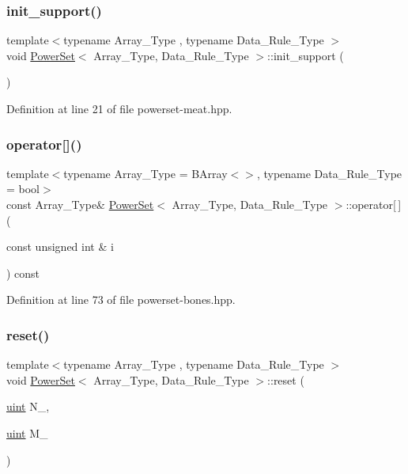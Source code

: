 \subsubsection{\texorpdfstring{init\+\_\+support()}{init\_support()}}
{\footnotesize\ttfamily template$<$typename Array\+\_\+\+Type , typename Data\+\_\+\+Rule\+\_\+\+Type $>$ \\
void \hyperlink{class_power_set}{Power\+Set}$<$ Array\+\_\+\+Type, Data\+\_\+\+Rule\+\_\+\+Type $>$\+::init\+\_\+support (\begin{DoxyParamCaption}{ }\end{DoxyParamCaption})\hspace{0.3cm}{\ttfamily [inline]}}



Definition at line 21 of file powerset-\/meat.\+hpp.

\mbox{\label{class_power_set_acc822131a9fbfd5b87f85b675f293d39}} 
\subsubsection{\texorpdfstring{operator[]()}{operator[]()}}
{\footnotesize\ttfamily template$<$typename Array\+\_\+\+Type  = B\+Array$<$$>$, typename Data\+\_\+\+Rule\+\_\+\+Type  = bool$>$ \\
const Array\+\_\+\+Type\& \hyperlink{class_power_set}{Power\+Set}$<$ Array\+\_\+\+Type, Data\+\_\+\+Rule\+\_\+\+Type $>$\+::operator\mbox{[}$\,$\mbox{]} (\begin{DoxyParamCaption}\item[{const unsigned int \&}]{i }\end{DoxyParamCaption}) const\hspace{0.3cm}{\ttfamily [inline]}}



Definition at line 73 of file powerset-\/bones.\+hpp.

\mbox{\label{class_power_set_aba11dd8802cd2eb529c7c30b55994248}} 
\subsubsection{\texorpdfstring{reset()}{reset()}}
{\footnotesize\ttfamily template$<$typename Array\+\_\+\+Type , typename Data\+\_\+\+Rule\+\_\+\+Type $>$ \\
void \hyperlink{class_power_set}{Power\+Set}$<$ Array\+\_\+\+Type, Data\+\_\+\+Rule\+\_\+\+Type $>$\+::reset (\begin{DoxyParamCaption}\item[{\hyperlink{typedefs_8hpp_a91ad9478d81a7aaf2593e8d9c3d06a14}{uint}}]{N\+\_\+,  }\item[{\hyperlink{typedefs_8hpp_a91ad9478d81a7aaf2593e8d9c3d06a14}{uint}}]{M\+\_\+ }\end{DoxyParamCaption})\hspace{0.3cm}{\ttfamily [inline]}}



